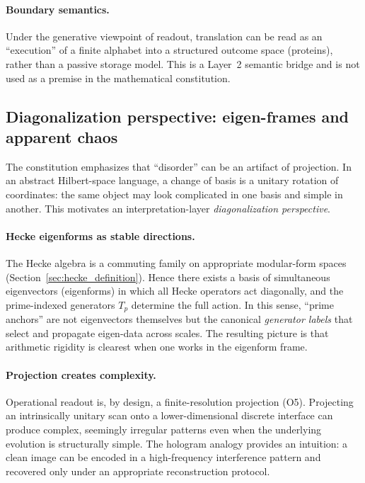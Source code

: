\paragraph{Boundary semantics.}
Under the generative viewpoint of readout, translation can be read as an ``execution'' of a finite alphabet into a structured outcome space (proteins), rather than a passive storage model. This is a Layer~2 semantic bridge and is not used as a premise in the mathematical constitution.

\subsection{Diagonalization perspective: eigen-frames and apparent chaos}
\label{sec:diagonalization_perspective}

The constitution emphasizes that ``disorder'' can be an artifact of projection. In an abstract Hilbert-space language, a change of basis is a unitary rotation of coordinates: the same object may look complicated in one basis and simple in another. This motivates an interpretation-layer \emph{diagonalization perspective}.

\paragraph{Hecke eigenforms as stable directions.}
The Hecke algebra is a commuting family on appropriate modular-form spaces (Section~\ref{sec:hecke_definition}). Hence there exists a basis of simultaneous eigenvectors (eigenforms) in which all Hecke operators act diagonally, and the prime-indexed generators $T_p$ determine the full action. In this sense, ``prime anchors'' are not eigenvectors themselves but the canonical \emph{generator labels} that select and propagate eigen-data across scales. The resulting picture is that arithmetic rigidity is clearest when one works in the eigenform frame.

\paragraph{Projection creates complexity.}
Operational readout is, by design, a finite-resolution projection (O5). Projecting an intrinsically unitary scan onto a lower-dimensional discrete interface can produce complex, seemingly irregular patterns even when the underlying evolution is structurally simple. The hologram analogy provides an intuition: a clean image can be encoded in a high-frequency interference pattern and recovered only under an appropriate reconstruction protocol.

